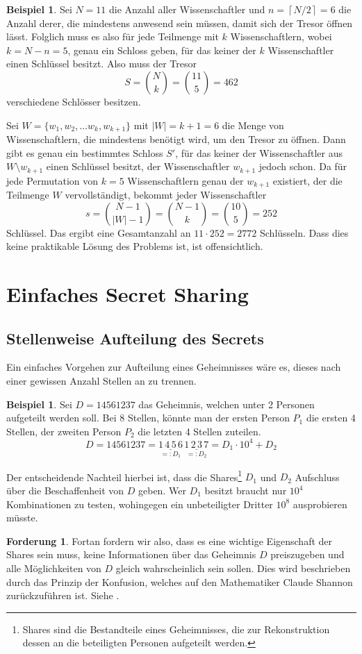 \documentclass[12pt, a4paper, oneside, titlepage]{report}
\theoremstyle{definition}
\newtheorem{ford}[lemma]{Forderung}
\newtheorem{bsp}[lemma]{Beispiel}
\begin{document}
	\begin{bsp}
		Sei $ N = 11 $ die Anzahl aller Wissenschaftler und $ n = \left\lceil N / 2 \right\rceil = 6 $ die Anzahl derer, die mindestens anwesend sein müssen, damit sich der Tresor öffnen lässt. Folglich muss es also für jede Teilmenge mit $ k $ Wissenschaftlern, wobei $ k = N - n = 5 $, genau ein Schloss geben, für das keiner der $ k $ Wissenschaftler einen Schlüssel besitzt. Also muss der Tresor $$ S = \binom{N}{k} = \binom{11}{5} = 462 $$ verschiedene Schlösser besitzen.
		
		Sei $ W = \{w_1, w_2, \dots w_k, w_{k+1}\} $ mit $ |W| = k + 1 = 6 $ die Menge von Wissenschaftlern, die mindestens benötigt wird, um den Tresor zu öffnen. Dann gibt es genau ein bestimmtes Schloss $ S' $, für das keiner der Wissenschaftler aus $ W \setminus w_{k+1} $ einen Schlüssel besitzt, der Wissenschaftler $ w_{k+1} $ jedoch schon. Da für jede Permutation von $ k = 5 $ Wissenschaftlern genau der $ w_{k+1} $ existiert, der die Teilmenge $ W $ \glqq vervollständigt\grqq, bekommt jeder Wissenschaftler $$ s = \binom{N-1}{|W|-1} = \binom{N-1}{k} = \binom{10}{5} = 252 $$ Schlüssel. Das ergibt eine Gesamtanzahl an $ 11 \cdot 252 = 2772 $ Schlüsseln. Dass dies keine praktikable Lösung des Problems ist, ist offensichtlich.
	\end{bsp}
	\section{Einfaches Secret Sharing}
	\subsection{Stellenweise Aufteilung des Secrets}
		Ein einfaches Vorgehen zur Aufteilung eines Geheimnisses wäre es, dieses nach einer gewissen Anzahl Stellen an zu trennen.
		
		\begin{bsp}
			Sei $ D = 14561237 $ das Geheimnis, welchen unter 2 Personen aufgeteilt werden soll. Bei 8 Stellen, könnte man der ersten Person $ P_1 $ die ersten 4 Stellen, der zweiten Person $ P_2 $ die letzten 4 Stellen zuteilen.
			$$ D = 14561237 = \underset{=:D_1}{\underline{1\,4\,5\,6}} \, \underset{=:D_2}{\underline{1\,2\,3\,7}} = D_1 \cdot 10^4 + D_2 $$
		\end{bsp}
		
		\noindent
		Der entscheidende Nachteil hierbei ist, dass die Shares\footnote{Shares sind die Bestandteile eines Geheimnisses, die zur Rekonstruktion dessen an die beteiligten Personen aufgeteilt werden.} $ D_1 $ und $ D_2 $ Aufschluss über die Beschaffenheit von $ D $ geben. Wer $ D_1 $ besitzt braucht nur $ 10^4 $ Kombinationen zu testen, wohingegen ein unbeteiligter Dritter $ 10^8 $ ausprobieren müsste.
		\begin{ford}
			Fortan fordern wir also, dass es eine wichtige Eigenschaft der Shares sein muss, keine Informationen über das Geheimnis $ D $ preiszugeben und alle Möglichkeiten von $ D $ gleich wahrscheinlich sein sollen. Dies wird beschrieben durch das Prinzip der Konfusion, welches auf den Mathematiker Claude Shannon zurückzuführen ist. Siehe \cite{shannon}.
		\end{ford}
		
\end{document}
